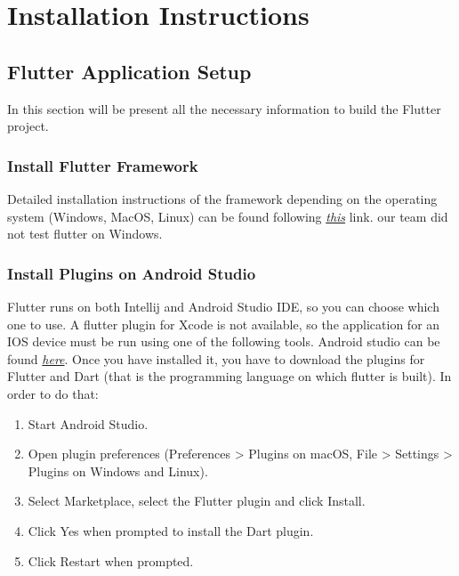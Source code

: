 \documentclass[../ITD.tex]{subfiles}
\begin{document}
    \chapter{Installation Instructions}\label{ch:installation-instructions}
    \section{Flutter Application Setup}\label{sec:flutter-application-setup}
    In this section will be present all the necessary information to build the
    Flutter project.
    \subsection{Install Flutter Framework}\label{subsec:install-flutter-framework}
    Detailed installation instructions of the framework depending on the operating system (Windows, MacOS, Linux)
    can be found following
    \href{https://flutter.dev/docs/get-started/install}{\textit{this}} link.
    our team did not test flutter on Windows.
    \subsection{Install Plugins on Android Studio}\label{subsec:install-plugins-on-android-studio}
    Flutter runs on both Intellij and Android Studio IDE, so you can choose which one to use.
    A flutter plugin for Xcode is not available, so the application for an IOS device must be run using one of the following tools.
    Android studio can be found \href{https://developer.android.com/studio}{\textit{here}}.
    Once you have installed it, you have to download the plugins for Flutter and Dart (that is the programming language on which flutter is built).
    In order to do that:
    \begin{enumerate}
        \item Start Android Studio.
        \item Open plugin preferences (Preferences > Plugins on macOS, File > Settings > Plugins on Windows and Linux).
        \item Select Marketplace, select the Flutter plugin and click Install.
        \item Click Yes when prompted to install the Dart plugin.
        \item Click Restart when prompted.
    \end{enumerate}
\end{document}
